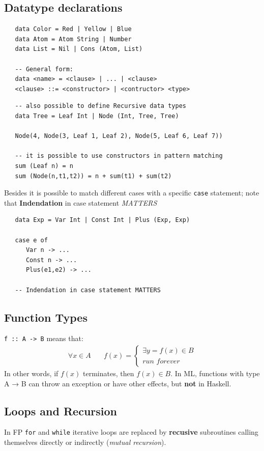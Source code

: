 \subsection{Datatype declarations}
\begin{lstlisting}
   data Color = Red | Yellow | Blue
   data Atom = Atom String | Number
   data List = Nil | Cons (Atom, List)

   -- General form:
   data <name> = <clause> | ... | <clause>
   <clause> ::= <constructor> | <contructor> <type>
\end{lstlisting}

\begin{lstlisting}
   -- also possible to define Recursive data types
   data Tree = Leaf Int | Node (Int, Tree, Tree)

   Node(4, Node(3, Leaf 1, Leaf 2), Node(5, Leaf 6, Leaf 7))

   -- it is possible to use constructors in pattern matching
   sum (Leaf n) = n
   sum (Node(n,t1,t2)) = n + sum(t1) + sum(t2)
\end{lstlisting}

Besides it is possible to match different cases with a specific \texttt{case} statement;
note that \textbf{Indendation} in case statement \textit{MATTERS}
\begin{lstlisting}
   data Exp = Var Int | Const Int | Plus (Exp, Exp)

   case e of
      Var n -> ...
      Const n -> ...
      Plus(e1,e2) -> ...

   -- Indendation in case statement MATTERS
\end{lstlisting}

\subsection{Function Types}
\lstinline{f :: A -> B} means that:
 \begin{align*}
   \forall x \in A \quad & f(x) =
   \begin{cases}
      \exists y = f(x) \in B \\
      \textit{run forever}
   \end{cases}
\end{align*}
In other words, if $f(x)$ terminates, then $f(x) \in B$.
In ML, functions with type A → B can throw an exception or
have other effects, but \textbf{not} in Haskell.

\subsection{Loops and Recursion}
In FP \texttt{for} and \texttt{while} iterative loops are replaced by \textbf{recusive} subroutines calling themselves directly or indirectly (\textit{mutual recursion}).

